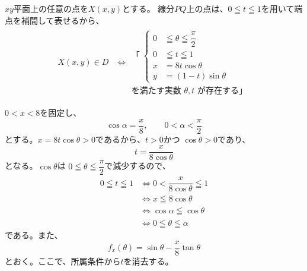 $xy$平面上の任意の点を$X(x,y)$とする。
線分$PQ$上の点は、$0\leqq t\leqq1$を用いて端点を補間して表せるから、
\[
\begin{aligned}
X(x,y)\in D
&\Longleftrightarrow
\begin{gathered}
\text{「}\;
\left\{
\begin{aligned}
0&\leqq\theta\leqq\dfrac{\pi}{2}\\
0&\leqq t\leqq1\\
x&=8t\cos\theta\\
y&=(1-t)\sin\theta
\end{aligned}
\right.\\
\text{を満たす実数 }\theta,t\text{ が存在する」}
\end{gathered}
\end{aligned}
\]

$0<x<8$を固定し、
\[
\cos\alpha=\dfrac{x}{8},
\qquad
0<\alpha<\dfrac{\pi}{2}
\]
とする。$x=8t\cos\theta>0$であるから、$t>0$かつ
$\cos\theta>0$であり、
\[
t=\dfrac{x}{8\cos\theta}
\]
となる。$\cos\theta$は
$0\leqq\theta\leqq\dfrac{\pi}{2}$で減少するので、
\[
\begin{aligned}
0\leqq t\leqq1
&\Longleftrightarrow
0<\dfrac{x}{8\cos\theta}\leqq1\\
&\Longleftrightarrow
x\leqq8\cos\theta\\
&\Longleftrightarrow
\cos\alpha\leqq\cos\theta\\
&\Longleftrightarrow
0\leqq\theta\leqq\alpha
\end{aligned}
\]
である。また、
\[
f_x(\theta)
=\sin\theta-\dfrac{x}{8}\tan\theta
\]
とおく。ここで、所属条件から$t$を消去する。
